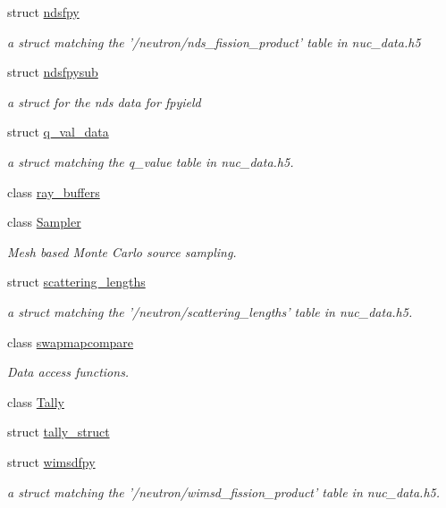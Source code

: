 \begin{DoxyCompactItemize}
struct \hyperlink{structpyne_1_1ndsfpy}{ndsfpy}
\begin{DoxyCompactList}\small\item\em a struct matching the '/neutron/nds\+\_\+fission\+\_\+product' table in nuc\+\_\+data.\+h5 \end{DoxyCompactList}\item 
struct \hyperlink{structpyne_1_1ndsfpysub}{ndsfpysub}
\begin{DoxyCompactList}\small\item\em a struct for the nds data for fpyield \end{DoxyCompactList}\item 
struct \hyperlink{structpyne_1_1q__val__data}{q\+\_\+val\+\_\+data}
\begin{DoxyCompactList}\small\item\em a struct matching the q\+\_\+value table in nuc\+\_\+data.\+h5. \end{DoxyCompactList}\item 
class \hyperlink{classpyne_1_1ray__buffers}{ray\+\_\+buffers}
\item 
class \hyperlink{classpyne_1_1_sampler}{Sampler}
\begin{DoxyCompactList}\small\item\em Mesh based Monte Carlo source sampling. \end{DoxyCompactList}\item 
struct \hyperlink{structpyne_1_1scattering__lengths}{scattering\+\_\+lengths}
\begin{DoxyCompactList}\small\item\em a struct matching the '/neutron/scattering\+\_\+lengths' table in nuc\+\_\+data.\+h5. \end{DoxyCompactList}\item 
class \hyperlink{classpyne_1_1swapmapcompare}{swapmapcompare}
\begin{DoxyCompactList}\small\item\em Data access functions. \end{DoxyCompactList}\item 
class \hyperlink{classpyne_1_1_tally}{Tally}
\item 
struct \hyperlink{structpyne_1_1tally__struct}{tally\+\_\+struct}
\item 
struct \hyperlink{structpyne_1_1wimsdfpy}{wimsdfpy}
\begin{DoxyCompactList}\small\item\em a struct matching the '/neutron/wimsd\+\_\+fission\+\_\+product' table in nuc\+\_\+data.\+h5. \end{DoxyCompactList}\end{DoxyCompactItemize}
